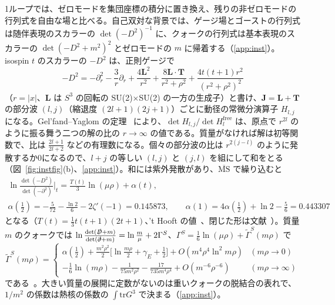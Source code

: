 \documentclass[a4paper,10pt]{ltjsarticle}
\newcommand{\MSbar}{\overline{\mathrm{MS}}}
\newcommand{\tr}{\mathrm{tr}}
\begin{document}
1ループでは、ゼロモードを集団座標の積分に置き換え、残りの非ゼロモードの行列式を自由な場と比べる。自己双対な背景では、ゲージ場とゴーストの行列式は随伴表現のスカラーの $\det(-D^2)^{-1}$ に、クォークの行列式は基本表現のスカラーの $\det(-D^2+m^2)^2$ とゼロモードの $m$ に帰着する（\ref{app:inst}）。isospin $t$ のスカラーの $-D^2$ は、正則ゲージで
\begin{equation}
-D^2=-\partial_r^2-\frac3r\partial_r+\frac{4\boldsymbol L^2}{r^2}+\frac{8\boldsymbol L\cdot\boldsymbol T}{r^2+\rho^2}+\frac{4t(t+1)r^2}{(r^2+\rho^2)^2}
\label{eq:instrad}
\end{equation}
（$r=|x|$、$\boldsymbol L$ は $S^3$ の回転の SU(2)$\times$SU(2) の一方の生成子）と書け、$\boldsymbol J=\boldsymbol L+\boldsymbol T$ の部分波 $(l,j)$（縮退度 $(2l+1)(2j+1)$）ごとに動径の常微分演算子 $H_{l,j}$ になる。Gel'fand--Yaglom の定理~\cite{gy60} により、$\det H_{l,j}/\det H^{\mathrm{free}}_l$ は、原点で $r^{2l}$ のように振る舞う二つの解の比の $r\to\infty$ の値である。質量がなければ解は初等関数で、比は $\frac{2l+1}{2l+2}$ などの有理数になる。個々の部分波の比は $r^{2(j-l)}$ のように発散するか0になるので、$l+j$ の等しい $(l,j)$ と $(j,l)$ を組にして和をとる（図~\ref{fig:instfig}(b)、\ref{app:inst}）。和には紫外発散があり、$\MSbar$ で繰り込むと
\begin{equation}
\begin{gathered}
\ln\frac{\det(-D^2)}{\det(-\partial^2)}\bigg|_t=\frac{T(t)}3\ln(\mu\rho)+\alpha(t),\\
\alpha(\tfrac12)=-\frac5{72}-\frac{\ln2}6-2\zeta'(-1)=0.145873,\qquad \alpha(1)=4\alpha(\tfrac12)+\ln2-\frac56=0.443307
\end{gathered}
\label{eq:alpha}
\end{equation}
となる（$T(t)=\frac13t(t+1)(2t+1)$、't Hooft の値~\cite{thooft76}、閉じた形は文献~\cite{dhlm05b,fm25}）。質量 $m$ のクォークでは $\ln\frac{\det(\slashed D+m)}{\det(\slashed\partial+m)}=\ln\frac m\mu+2\Gamma^S$、$\Gamma^S=\frac16\ln(\mu\rho)+\tilde\Gamma^S(m\rho)$ で
\begin{equation}
\tilde\Gamma^S(m\rho)=
\begin{cases}
\alpha(\frac12)+\frac{m^2\rho^2}2\bigl[\ln\frac{m\rho}2+\gamma_E+\frac12\bigr]+O(m^4\rho^4\ln^2m\rho) & (m\rho\to0)\\[3pt]
-\frac16\ln(m\rho)-\frac1{75m^2\rho^2}-\frac{17}{735m^4\rho^4}+O(m^{-6}\rho^{-6}) & (m\rho\to\infty)
\end{cases}
\label{eq:instmass}
\end{equation}
である~\cite{dhlm05,dhlm05b,hlm09}。大きい質量の展開に定数がないのは重いクォークの脱結合の表れで、$1/m^2$ の係数は熱核の係数の $\int\tr G^3$ で決まる（\ref{app:inst}）。
\end{document}
